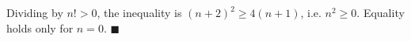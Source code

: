 Dividing by $n!>0$, the inequality is $(n+2)^2\ge4(n+1)$, i.e. $n^2\ge0$. Equality holds only for $\boxed{n=0}$. $\blacksquare$
